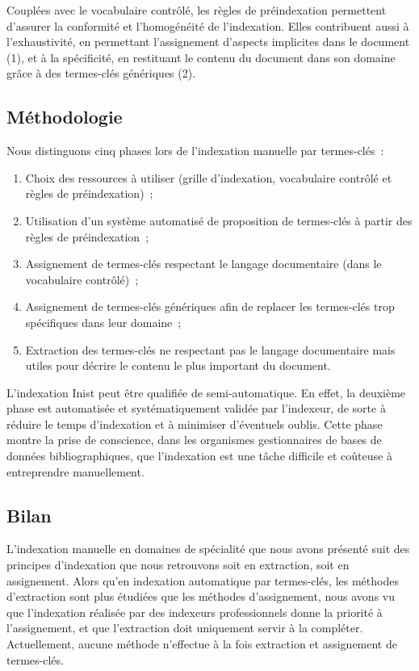         Couplées avec le vocabulaire contrôlé, les règles de préindexation
        permettent d'assurer la conformité et l'homogénéité de l'indexation.
        Elles contribuent aussi à l'exhaustivité, en permettant l'assignement
        d'aspects implicites dans le document (1), et à la spécificité, en
        restituant le contenu du document dans son domaine grâce à des
        termes-clés génériques (2).

    \subsection{Méthodologie}
    \label{subsec:main-domain_specific_keyphrase_annotation-manual_keyphrase_annotation-methodology}
      Nous distinguons cinq phases lors de l'indexation manuelle par
      termes-clés~:
      \begin{enumerate}
        \item{Choix des ressources à utiliser (grille d'indexation, vocabulaire
              contrôlé et règles de préindexation)~;}
        \item{Utilisation d'un système automatisé de proposition de termes-clés
              à partir des règles de préindexation~;}
        \item{Assignement de termes-clés respectant le langage documentaire
              (dans le vocabulaire contrôlé)~;}
        \item{Assignement de termes-clés génériques afin de replacer les
              termes-clés trop spécifiques dans leur domaine~;}
        \item{Extraction des termes-clés ne respectant pas le langage
              documentaire mais utiles pour décrire le contenu le plus important
              du document.}
      \end{enumerate}

      L'indexation Inist peut être qualifiée de semi-automatique. En effet, la
      deuxième phase est automatisée et systématiquement validée par l'indexeur,
      de sorte à réduire le temps d'indexation et à minimiser d'éventuels
      oublis. Cette phase montre la prise de conscience, dans les organismes
      gestionnaires de bases de données bibliographiques, que l'indexation est
      une tâche difficile et coûteuse à entreprendre manuellement.

    \subsection{Bilan}
    \label{subsec:main-domain_specific_keyphrase_annotation-manual_keyphrase_annotation-conclusion}
      L'indexation manuelle en domaines de spécialité que nous avons présenté
      suit des principes d'indexation que nous retrouvons soit en extraction,
      soit en assignement. Alors qu'en indexation automatique par termes-clés,
      les méthodes d'extraction sont plus étudiées que les méthodes
      d'assignement, nous avons vu que l'indexation réalisée par des indexeurs
      professionnels donne la priorité à l'assignement, et que l'extraction doit
      uniquement servir à la compléter. Actuellement, aucune méthode n'effectue
      à la fois extraction et assignement de termes-clés.

